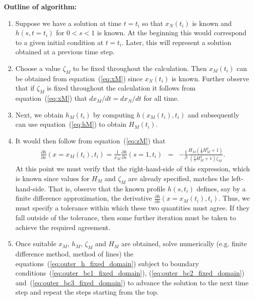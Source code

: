 \documentclass[11pt]{article}
\newcommand{\bea}{\begin{eqnarray}}
\newcommand{\eea}{\end{eqnarray}}
\begin{document}
{\bf Outline of algorithm: {\color{red}{DMA still thinking about some of these ideas ...}}}
\begin{enumerate}
\item Suppose we have a solution at time $t=t_i$ so that $x_N(t_i)$ is known and $h(s,t=t_i)$ for $0 < s < 1$ is known.  
At the beginning this would correspond to a given initial condition at $t=t_i$.  Later, this will represent a solution obtained at a previous time step.
%
\item Choose a value $\zeta_M$ to be fixed throughout the calculation.   Then $x_M(t_i)$ can be obtained from equation~(\ref{eq:xM}) since $x_N(t_i)$ is known.  Further
observe that if $\zeta_M$ is fixed throughout the calculation it follows from equation~(\ref{eq:xM}) that $d x_M/dt = d x_N/dt$ for all time.
%
\item Next, we obtain $h_M(t_i)$ by computing $h(x_M(t_i),t_i)$ and subsequently can use equation~(\ref{eq:hM}) to obtain $H_M(t_i)$.
%
\item It would then follow from equation~(\ref{eq:zM}) that
\bea
\frac{\partial h}{\partial x}(x=x_M(t_i),t_i)  = \frac{1}{x_M} \frac{\partial h}{\partial s}(s=1,t_i)& = & - \frac{1}{\beta} \frac{H_M \left( \frac{1}{9} H_M^2 + 1 \right) }{ \left( \frac{1}{3} H_M^2 + 1 \right) \zeta_M }.
\eea
At this point we must verify that the right-hand-side of this expression, which is known since values for $H_M$ and $\zeta_M$ are already specified, matches the left-hand-side.
That is, observe that the known profile $h(s,t_i)$ defines, say by a finite difference approximation, the derivative $\frac{\partial h}{\partial x}(x=x_M(t_i),t_i)$.  Thus, we
must specify a tolerance within which these two quantities must agree.  If they fall outside of the tolerance, then some further iteration must be taken to 
achieve the required agreement.
%
\item Once suitable $x_M$, $h_M$, $\zeta_M$ and $H_M$ are obtained, solve numerically (e.g. finite difference method, method of lines) the equations~(\ref{eq:outer_h_fixed_domain}) 
subject to boundary conditions~(\ref{eq:outer_bc1_fixed_domain}), (\ref{eq:outer_bc2_fixed_domain}) and~(\ref{eq:outer_bc3_fixed_domain}) to advance the solution to the next time step and repeat the steps starting from the top.
\end{enumerate}

\end{document}
